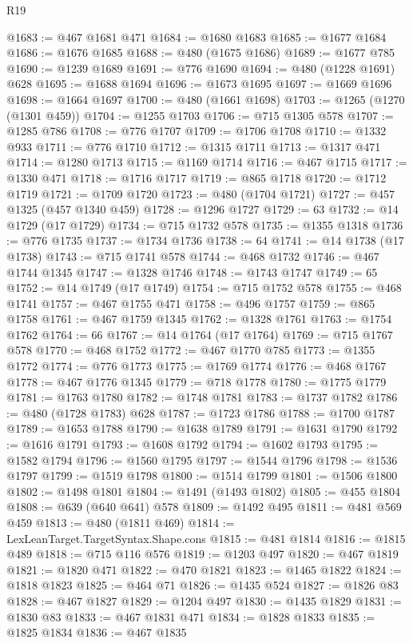 \begin{lexlean}{R19}
\begin{coremodule}
@1683 := @467 @1681 @471
@1684 := @1680 @1683
@1685 := @1677 @1684
@1686 := @1676 @1685
@1688 := @480 (@1675 @1686)
@1689 := @1677 @785
@1690 := @1239 @1689
@1691 := @776 @1690
@1694 := @480 (@1228 @1691) @628
@1695 := @1688 @1694
@1696 := @1673 @1695
@1697 := @1669 @1696
@1698 := @1664 @1697
@1700 := @480 (@1661 @1698)
@1703 := @1265 (@1270 (@1301 @459))
@1704 := @1255 @1703
@1706 := @715 @1305 @578
@1707 := @1285 @786
@1708 := @776 @1707
@1709 := @1706 @1708
@1710 := @1332 @933
@1711 := @776 @1710
@1712 := @1315 @1711
@1713 := @1317 @471
@1714 := @1280 @1713
@1715 := @1169 @1714
@1716 := @467 @1715
@1717 := @1330 @471
@1718 := @1716 @1717
@1719 := @865 @1718
@1720 := @1712 @1719
@1721 := @1709 @1720
@1723 := @480 (@1704 @1721)
@1727 := @457 @1325 (@457 @1340 @459)
@1728 := @1296 @1727
@1729 := 63
@1732 := @14 @1729 (@17 @1729)
@1734 := @715 @1732 @578
@1735 := @1355 @1318
@1736 := @776 @1735
@1737 := @1734 @1736
@1738 := 64
@1741 := @14 @1738 (@17 @1738)
@1743 := @715 @1741 @578
@1744 := @468 @1732
@1746 := @467 @1744 @1345
@1747 := @1328 @1746
@1748 := @1743 @1747
@1749 := 65
@1752 := @14 @1749 (@17 @1749)
@1754 := @715 @1752 @578
@1755 := @468 @1741
@1757 := @467 @1755 @471
@1758 := @496 @1757
@1759 := @865 @1758
@1761 := @467 @1759 @1345
@1762 := @1328 @1761
@1763 := @1754 @1762
@1764 := 66
@1767 := @14 @1764 (@17 @1764)
@1769 := @715 @1767 @578
@1770 := @468 @1752
@1772 := @467 @1770 @785
@1773 := @1355 @1772
@1774 := @776 @1773
@1775 := @1769 @1774
@1776 := @468 @1767
@1778 := @467 @1776 @1345
@1779 := @718 @1778
@1780 := @1775 @1779
@1781 := @1763 @1780
@1782 := @1748 @1781
@1783 := @1737 @1782
@1786 := @480 (@1728 @1783) @628
@1787 := @1723 @1786
@1788 := @1700 @1787
@1789 := @1653 @1788
@1790 := @1638 @1789
@1791 := @1631 @1790
@1792 := @1616 @1791
@1793 := @1608 @1792
@1794 := @1602 @1793
@1795 := @1582 @1794
@1796 := @1560 @1795
@1797 := @1544 @1796
@1798 := @1536 @1797
@1799 := @1519 @1798
@1800 := @1514 @1799
@1801 := @1506 @1800
@1802 := @1498 @1801
@1804 := @1491 (@1493 @1802)
@1805 := @455 @1804
@1808 := @639 (@640 @641) @578
@1809 := @1492 @495
@1811 := @481 @569 @459
@1813 := @480 (@1811 @469)
@1814 := LexLeanTarget.TargetSyntax.Shape.cons
@1815 := @481 @1814
@1816 := @1815 @489
@1818 := @715 @116 @576
@1819 := @1203 @497
@1820 := @467 @1819
@1821 := @1820 @471
@1822 := @470 @1821
@1823 := @1465 @1822
@1824 := @1818 @1823
@1825 := @464 @71
@1826 := @1435 @524
@1827 := @1826 @83
@1828 := @467 @1827
@1829 := @1204 @497
@1830 := @1435 @1829
@1831 := @1830 @83
@1833 := @467 @1831 @471
@1834 := @1828 @1833
@1835 := @1825 @1834
@1836 := @467 @1835

\end{coremodule}
\end{lexlean}
